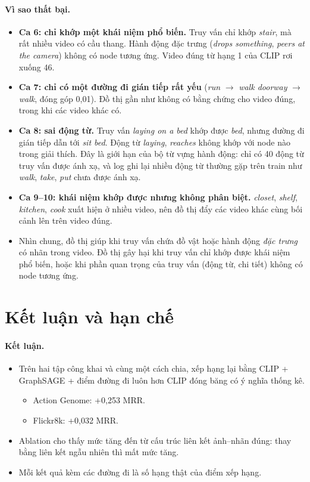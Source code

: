 \documentclass[11pt,a4paper]{article}
\begin{document}
\paragraph{Vì sao thất bại.}
\begin{itemize}
  \item \textbf{Ca 6: chỉ khớp một khái niệm phổ biến.} Truy vấn chỉ khớp \textit{stair}, mà rất nhiều video có cầu thang. Hành động đặc trưng (\textit{drops something}, \textit{peers at the camera}) không có node tương ứng. Video đúng từ hạng 1 của CLIP rơi xuống 46.
  \item \textbf{Ca 7: chỉ có một đường đi gián tiếp rất yếu} (\textit{run} \(\to\) \textit{walk doorway} \(\to\) \textit{walk}, đóng góp 0,01). Đồ thị gần như không có bằng chứng cho video đúng, trong khi các video khác có.
  \item \textbf{Ca 8: sai động từ.} Truy vấn \textit{laying on a bed} khớp được \textit{bed}, nhưng đường đi gián tiếp dẫn tới \textit{sit bed}. Động từ \textit{laying}, \textit{reaches} không khớp với node nào trong giải thích. Đây là giới hạn của bộ từ vựng hành động: chỉ có 40 động từ truy vấn được ánh xạ, và log ghi lại nhiều động từ thường gặp trên train như \textit{walk}, \textit{take}, \textit{put} chưa được ánh xạ.
  \item \textbf{Ca 9–10: khái niệm khớp được nhưng không phân biệt.} \textit{closet}, \textit{shelf}, \textit{kitchen}, \textit{cook} xuất hiện ở nhiều video, nên đồ thị đẩy các video khác cùng bối cảnh lên trên video đúng.
  \item Nhìn chung, đồ thị giúp khi truy vấn chứa đồ vật hoặc hành động \emph{đặc trưng} có nhãn trong video. Đồ thị gây hại khi truy vấn chỉ khớp được khái niệm phổ biến, hoặc khi phần quan trọng của truy vấn (động từ, chi tiết) không có node tương ứng.
\end{itemize}

\section{Kết luận và hạn chế}

\paragraph{Kết luận.}
\begin{itemize}
  \item Trên hai tập công khai và cùng một cách chia, xếp hạng lại bằng CLIP + GraphSAGE + điểm đường đi luôn hơn CLIP đóng băng có ý nghĩa thống kê.
  \begin{itemize}
    \item Action Genome: +0,253 MRR.
    \item Flickr8k: +0,032 MRR.
  \end{itemize}
  \item Ablation cho thấy mức tăng đến từ cấu trúc liên kết ảnh–nhãn đúng: thay bằng liên kết ngẫu nhiên thì mất mức tăng.
  \item Mỗi kết quả kèm các đường đi là số hạng thật của điểm xếp hạng.
\end{itemize}
\end{document}
